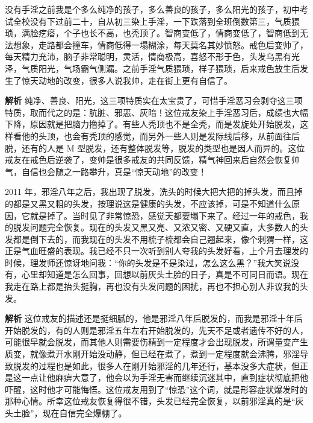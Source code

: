 \begin{case}\label{JiezheDianfengTiyan-ZixindeDafuTisheng1}
    没有手淫之前我是个多么纯净的孩子，多么善良的孩子，多么阳光的孩子，初中考试全校没有下过前二十，自从初三染上手淫，一下跌落到全班倒数第三，气质猥琐，满脸疙瘩，个子也长不高，也秃顶了。智商变低了，情商变低了，智商低到无法想象，走路都会撞车，情商低得一塌糊涂，每天莫名其妙愤怒。戒色后变帅了，每天精力充沛，脑子非常聪明，灵活，情商极高，喜怒不形于色，头发乌黑有光泽，气质阳光，气场霸气侧漏。之前手淫气质猥琐，样子猥琐，后来戒色放生后发生了惊天动地的改变，很多人说我帅，走在街上更有自信了。

    \textbf{解析} 纯净、善良、阳光，这三项特质实在太宝贵了，可惜手淫恶习会剥夺这三项特质，取而代之的是：肮脏、邪恶、灰暗！这位戒友染上手淫恶习后，成绩也大幅下降，原因就是把脑力撸掉了。有些人秃顶也不是全秃，而是发旋处开始脱发，这样看他的头顶，也会有秃顶的感觉，而另外一些人则是发际线后移，从前面往后脱，还有的人是 M 型脱发，还有整体脱发等，脱发的类型也是因人而异的。这位戒友在戒色后逆袭了，变帅是很多戒友的共同反馈，精气神回来后自然会恢复帅气，自信也会随之一路攀升，真是“惊天动地”的改变！
\end{case}

\begin{case}
    2011 年，邪淫八年之后，我出现了脱发，洗头的时候大把大把的掉头发，而且掉的都是又黑又粗的头发，按理说这是健康的头发，不应该掉，可是不知道什么原因，它就是掉了。当时见了非常惊恐，感觉天都要塌下来了。经过一年的戒色，我的脱发问题完全恢复。现在的头发又黑又亮、又浓又密、又硬又直，大多数人的头发都是倒下去的，而我现在的头发不用梳子梳都会自己翘起来，像个刺猬一样，这正是气血旺盛的表现。我已经不只一次听到别人夸我的头发好看，上个月去理发的时候，理发师还惊讶地问我：“你的头发是不是染过，怎么这么黑？”我大笑说没有，心里却知道是怎么回事，回想以前灰头土脸的日子，真是不可同日而语。现在我走在路上都是抬头挺胸，再也没有头发问题的困扰，再也不担心别人非议我的头发。

    \textbf{解析} 这位戒友的描述还是挺细腻的，他是邪淫八年后脱发的，而我是邪淫十年后开始脱发的，有的人则是邪淫五年左右开始脱发的，先天不足或者遗传不好的人，可能很早就会脱发，而其他人则需要伤精到一定程度才会出现脱发，所谓量变产生质变，就像煮开水刚开始没动静，但已经在煮了，煮到一定程度就会沸腾，邪淫导致脱发的过程也是如此，很多人在刚开始邪淫的几年还行，基本没多大症状，但正是这一点让他麻痹大意了，他会以为手淫无害而继续沉迷其中，直到症状彻底把他吓醒，这时他才可能悔悟。这位戒友用到了“惊恐”这个词，就是形容症状爆发时的那种心情。所幸这位戒友恢复得很不错，头发已经完全恢复，以前邪淫真的是“灰头土脸”，现在自信完全爆棚了。
\end{case}

